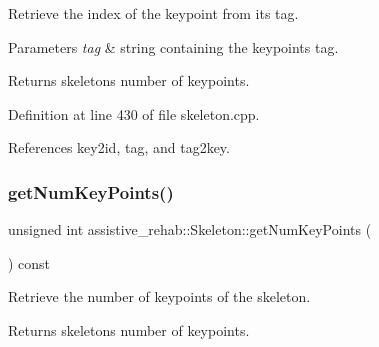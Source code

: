 Retrieve the index of the keypoint from its tag. 


\begin{DoxyParams}{Parameters}
{\em tag} & string containing the keypoint\textquotesingle{}s tag. \\
\hline
\end{DoxyParams}
\begin{DoxyReturn}{Returns}
skeleton\textquotesingle{}s number of keypoints. 
\end{DoxyReturn}


Definition at line 430 of file skeleton.\+cpp.


\begin{DoxyCode}{0}

\end{DoxyCode}


References key2id, tag, and tag2key.

\mbox{\label{classassistive__rehab_1_1Skeleton_ac5e5b98f2c9178f6e0def5033e27922f}} 
\subsubsection{\texorpdfstring{getNumKeyPoints()}{getNumKeyPoints()}}
{\footnotesize\ttfamily unsigned int assistive\+\_\+rehab\+::\+Skeleton\+::get\+Num\+Key\+Points (\begin{DoxyParamCaption}{ }\end{DoxyParamCaption}) const\hspace{0.3cm}{\ttfamily [inline]}}



Retrieve the number of keypoints of the skeleton. 

\begin{DoxyReturn}{Returns}
skeleton\textquotesingle{}s number of keypoints. 
\end{DoxyReturn}


